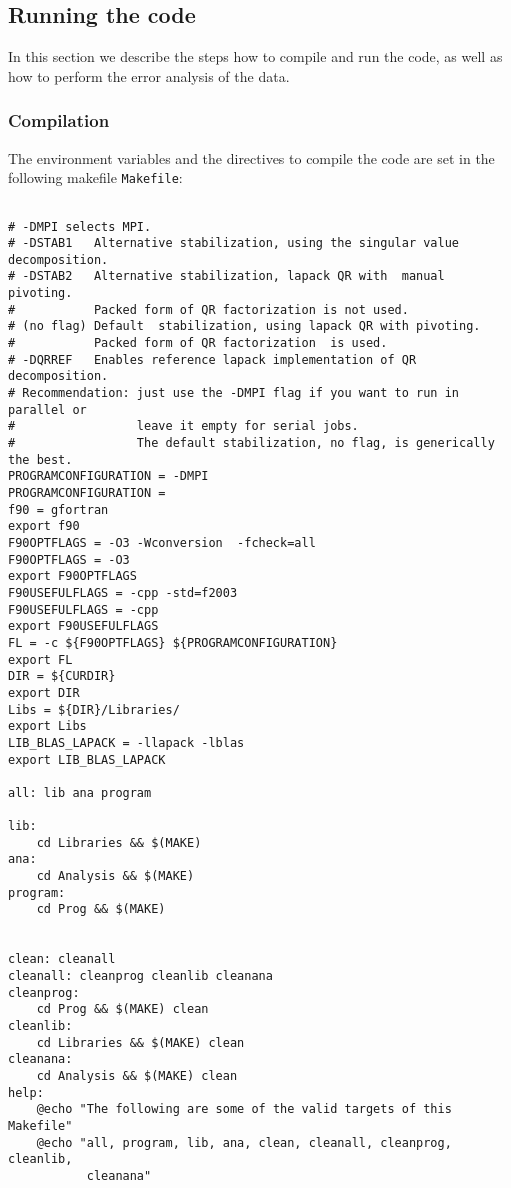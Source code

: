 \documentclass{SciPost}
\begin{document}
%
\subsection{Running the code}\label{sec:running}
%
In this section we describe the steps how to compile and run the code, as well as how to perform the error analysis of the data.
%
\subsubsection{Compilation}
%
The environment variables and the directives to compile the code are set in the following makefile \texttt{Makefile}:
\lstset{style=bash}
\begin{lstlisting}

# -DMPI selects MPI.
# -DSTAB1   Alternative stabilization, using the singular value decomposition.
# -DSTAB2   Alternative stabilization, lapack QR with  manual pivoting.
#           Packed form of QR factorization is not used.
# (no flag) Default  stabilization, using lapack QR with pivoting. 
#           Packed form of QR factorization  is used. 
# -DQRREF   Enables reference lapack implementation of QR decomposition.
# Recommendation: just use the -DMPI flag if you want to run in parallel or 
#                 leave it empty for serial jobs.  
#                 The default stabilization, no flag, is generically the best. 
PROGRAMCONFIGURATION = -DMPI 
PROGRAMCONFIGURATION = 
f90 = gfortran
export f90
F90OPTFLAGS = -O3 -Wconversion  -fcheck=all
F90OPTFLAGS = -O3
export F90OPTFLAGS
F90USEFULFLAGS = -cpp -std=f2003
F90USEFULFLAGS = -cpp
export F90USEFULFLAGS
FL = -c ${F90OPTFLAGS} ${PROGRAMCONFIGURATION}
export FL
DIR = ${CURDIR}
export DIR
Libs = ${DIR}/Libraries/
export Libs
LIB_BLAS_LAPACK = -llapack -lblas
export LIB_BLAS_LAPACK

all: lib ana program

lib:
	cd Libraries && $(MAKE)
ana:
	cd Analysis && $(MAKE)
program:
	cd Prog && $(MAKE)


clean: cleanall
cleanall: cleanprog cleanlib cleanana
cleanprog:
	cd Prog && $(MAKE) clean
cleanlib:
	cd Libraries && $(MAKE) clean
cleanana:
	cd Analysis && $(MAKE) clean
help:
	@echo "The following are some of the valid targets of this Makefile"
	@echo "all, program, lib, ana, clean, cleanall, cleanprog, cleanlib,
	       cleanana"

\end{lstlisting}
\end{document}
